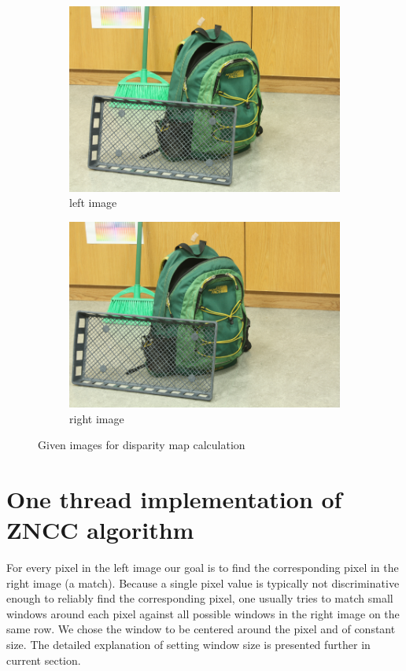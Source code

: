 \documentclass[conference]{IEEEtran}
\begin{document}
\begin{figure}[t!]
\centering
	\begin{subfigure}{0.49\linewidth}
		\centering
		\includegraphics[scale=0.15]{./figures/im_left.png}
 		\caption{left image}
	\end{subfigure}
	\begin{subfigure}{0.49\linewidth}
		\centering
		\includegraphics[scale=0.15]{./figures/im_right.png}
 		\caption{right image}
	\end{subfigure}
\caption{Given images for disparity map calculation}\label{fig:givenImages}
\end{figure}

\section{One thread implementation of ZNCC algorithm}\label{sec:CbasedImplementation}
For every pixel in the left image our goal is to find the corresponding pixel in the right image (a match). Because a single pixel value is typically not discriminative enough to reliably find the corresponding pixel, one usually tries to match small windows around each pixel against all possible windows in the right image on the same row. We chose the window to be centered around the pixel and of constant size. The detailed explanation of setting window size is presented further in current section.
\end{document}
